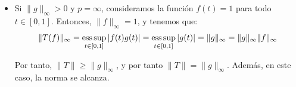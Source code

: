 \begin{ejercicio}
\begin{itemize}
\begin{itemize}
        \item Si $\lm(E)=0$, entonces $|g(t)| < \|g\|_\infty$ c.p.d. y, por tanto, $|f(t)|^p = 0$ c.p.d., y por tanto $f=0$ c.p.d., lo cual es una contradicción, ya que $f$ no es nula. Por tanto, en este caso, la norma no se alcanza.        
    \end{itemize}

    Por tanto, vemos que la norma se alcanza si y solo si el conjunto en el que se alcanza el supremo esencial de $g$ tiene medida positiva.


    \item Si $\|g\|_\infty > 0$ y $p=\infty$, consideramos la función $f(t) = 1$ para todo $t \in [0, 1]$. Entonces, $\|f\|_\infty = 1$, y tenemos que:
    \begin{equation*}
        \|T(f)\|_\infty = \operatorname*{ess\,sup}_{t \in [0, 1]} |f(t) g(t)| = \operatorname*{ess\,sup}_{t \in [0, 1]} |g(t)| = \|g\|_\infty
        = \|g\|_\infty \|f\|_\infty
    \end{equation*}

    Por tanto, $\|T\| \geq \|g\|_\infty$, y por tanto $\|T\| = \|g\|_\infty$. Además, en este caso, la norma se alcanza.
\end{itemize}
\end{ejercicio}

